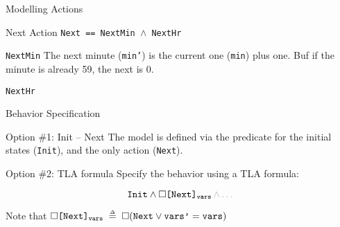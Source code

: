 \begin{frame}{Modelling Actions}
    \begin{block}{Next Action}
        \texttt{Next == NextMin $\land$ NextHr}
    \end{block}
    \pause
    \begin{block}{\texttt{NextMin}}
        The next minute (\texttt{min'}) is the current one (\texttt{min}) plus one. Buf if the minute is already 59, the next is 0.
        \demo
    \end{block}
    \pause
    \begin{block}{\texttt{NextHr}}
    \end{block}
\end{frame}

\begin{frame}{Behavior Specification}
    \begin{block}{Option \#1: Init -- Next}
        The model is defined via the predicate for the initial states (\texttt{Init}), and the only action (\texttt{Next}).
        \demo
    \end{block}
    \pause
    \begin{block}{Option \#2: TLA formula}
        Specify the behavior using a TLA formula:

        \[
            \texttt{Init} \land \square \texttt{[Next]}_{\texttt{vars}} \textcolor{gray!60}{\,\land \ldots}
        \]
        \demo

        Note that $\square \texttt{[Next]}_{\texttt{vars}} \;\mathrel{\smash {{\stackrel{\scriptscriptstyle\Delta}{=}}}}\; \square ( \texttt{Next} \lor \texttt{vars'} = \texttt{vars} )$
    \end{block}
\end{frame}

